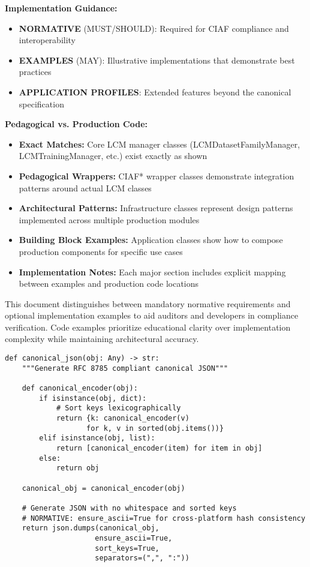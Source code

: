 \documentclass[12pt,a4paper]{article}
\begin{document}
\begin{tcolorbox}[colframe=blue!50, colback=blue!5, title={\textbf{Normative vs. Example Content}}]
\textbf{Implementation Guidance:}
\begin{itemize}
\item \textbf{NORMATIVE} (MUST/SHOULD): Required for CIAF compliance and interoperability
\item \textbf{EXAMPLES} (MAY): Illustrative implementations that demonstrate best practices
\item \textbf{APPLICATION PROFILES}: Extended features beyond the canonical specification
\end{itemize}

\textbf{Pedagogical vs. Production Code:}
\begin{itemize}
\item \textbf{Exact Matches:} Core LCM manager classes (LCMDatasetFamilyManager, LCMTrainingManager, etc.) exist exactly as shown
\item \textbf{Pedagogical Wrappers:} CIAF* wrapper classes demonstrate integration patterns around actual LCM classes
\item \textbf{Architectural Patterns:} Infrastructure classes represent design patterns implemented across multiple production modules
\item \textbf{Building Block Examples:} Application classes show how to compose production components for specific use cases
\item \textbf{Implementation Notes:} Each major section includes explicit mapping between examples and production code locations
\end{itemize}

This document distinguishes between mandatory normative requirements and optional implementation examples to aid auditors and developers in compliance verification. Code examples prioritize educational clarity over implementation complexity while maintaining architectural accuracy.
\end{tcolorbox}

\begin{lstlisting}[caption=Canonical JSON Implementation]
def canonical_json(obj: Any) -> str:
    """Generate RFC 8785 compliant canonical JSON"""
    
    def canonical_encoder(obj):
        if isinstance(obj, dict):
            # Sort keys lexicographically
            return {k: canonical_encoder(v) 
                   for k, v in sorted(obj.items())}
        elif isinstance(obj, list):
            return [canonical_encoder(item) for item in obj]
        else:
            return obj
    
    canonical_obj = canonical_encoder(obj)
    
    # Generate JSON with no whitespace and sorted keys
    # NORMATIVE: ensure_ascii=True for cross-platform hash consistency
    return json.dumps(canonical_obj, 
                     ensure_ascii=True,
                     sort_keys=True,
                     separators=(",", ":"))
\end{lstlisting}
\end{document}
